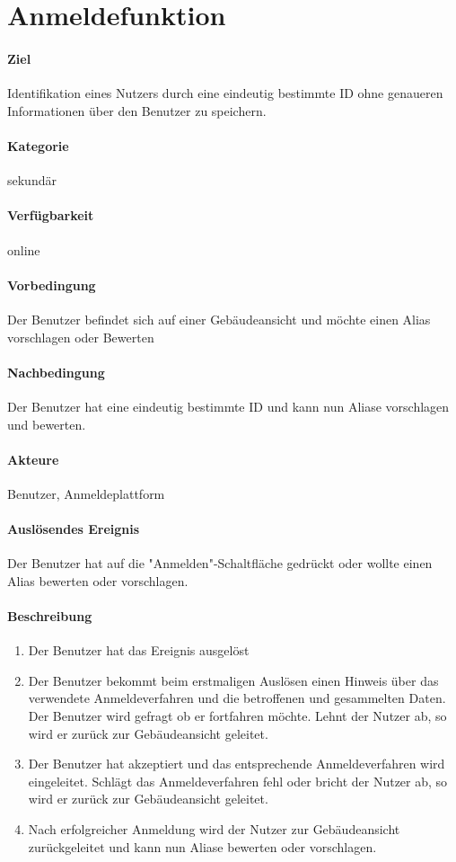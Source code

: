 \section{Anmeldefunktion}
\label{Anmeldefunktion}
\paragraph{Ziel}
Identifikation eines Nutzers durch eine eindeutig bestimmte ID ohne genaueren Informationen über den Benutzer zu speichern.
\paragraph{Kategorie}
sekundär
\paragraph{Verfügbarkeit}
online
\paragraph{Vorbedingung}
Der Benutzer befindet sich auf einer Gebäudeansicht und möchte einen Alias vorschlagen oder Bewerten
\paragraph{Nachbedingung}
Der Benutzer hat eine eindeutig bestimmte ID und kann nun Aliase vorschlagen und bewerten.
\paragraph{Akteure}
Benutzer, Anmeldeplattform
\paragraph{Auslösendes Ereignis}
Der Benutzer hat auf die "Anmelden"-Schaltfläche gedrückt oder wollte einen Alias bewerten oder vorschlagen.
\paragraph{Beschreibung}
\begin{enumerate}
    \item Der Benutzer hat das Ereignis ausgelöst
    \item Der Benutzer bekommt beim erstmaligen Auslösen einen Hinweis über das verwendete Anmeldeverfahren und die betroffenen und gesammelten Daten.
          Der Benutzer wird gefragt ob er fortfahren möchte.
          \subitem Lehnt der Nutzer ab, so wird er zurück zur Gebäudeansicht geleitet.
    \item Der Benutzer hat akzeptiert und das entsprechende Anmeldeverfahren wird eingeleitet.
          \subitem Schlägt das Anmeldeverfahren fehl oder bricht der Nutzer ab, so wird er zurück zur Gebäudeansicht geleitet.
    \item Nach erfolgreicher Anmeldung wird der Nutzer zur Gebäudeansicht zurückgeleitet und kann nun Aliase bewerten oder vorschlagen.
\end{enumerate}